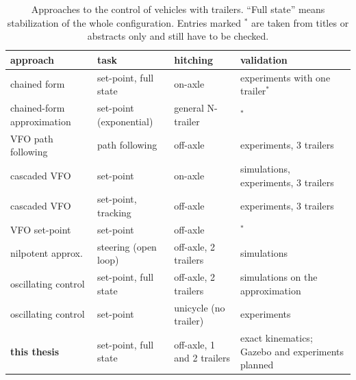 \begin{table}[ht]
  \centering
  \small
  \caption{Approaches to the control of vehicles with trailers. ``Full state''
    means stabilization of the whole configuration. Entries marked $^\ast$ are
    taken from titles or abstracts only and still have to be checked.}
  \label{tab:bg-state}
  \begin{tabular}{@{}>{\raggedright\arraybackslash}p{3.6cm}>{\raggedright\arraybackslash}p{3.1cm}>{\raggedright\arraybackslash}p{2.7cm}>{\raggedright\arraybackslash}p{3.2cm}@{}}
    \toprule
    approach & task & hitching & validation \\
    \midrule
    chained form \cite{sordalen1993,mccloskey1997} & set-point, full state
      & on-axle & experiments with one trailer$^\ast$ \cite{mccloskey1994} \\
    chained-form approximation \cite{lizarraga2001} & set-point (exponential)
      & general N-trailer & $^\ast$ \\
    VFO path following \cite{michalek2014pf} & path following & off-axle
      & experiments, 3 trailers \\
    cascaded VFO \cite{michalek2014tcst} & set-point & on-axle
      & simulations, experiments, 3 trailers \\
    cascaded VFO \cite{michalek2015jint} & set-point, tracking & off-axle
      & experiments, 3 trailers \\
    VFO set-point \cite{michalek2012} & set-point & off-axle & $^\ast$ \\
    nilpotent approx.\ \cite{vendittelli1998} & steering (open loop)
      & off-axle, 2 trailers & simulations \cite{zuyev2024} \\
    oscillating control \cite{zuyev2024} & set-point, full state
      & off-axle, 2 trailers & simulations on the approximation \\
    oscillating control \cite{zuyev2026implementation} & set-point
      & unicycle (no trailer) & experiments \\
    \textbf{this thesis} & set-point, full state & off-axle, 1 and 2 trailers
      & exact kinematics; Gazebo and experiments planned \\
    \bottomrule
  \end{tabular}
\end{table}

